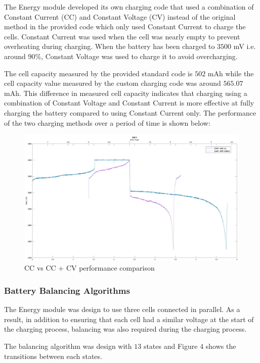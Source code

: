 \documentclass[11pt, a4paper]{article}
\begin{document}
The Energy module developed its own charging code that used a combination of Constant Current (CC) and Constant Voltage (CV) instead of the original method in the provided code which only used Constant Current to charge the cells. Constant Current was used when the cell was nearly empty to prevent overheating during charging\cite{Energy_constant_current}. When the battery has been charged to $3500$ mV i.e. around 90\%, Constant Voltage was used to charge it to avoid overcharging. 

The cell capacity measured by the provided standard code is $502$ mAh while the cell capacity value measured by the custom charging code was around $565.07$ mAh. This difference in measured cell capacity indicates that charging using a combination of Constant Voltage and Constant Current is more effective at fully charging the battery compared to using Constant Current only. The performance of the two charging methods over a period of time is shown below:
\begin{figure} [h!]
    \centering
    \includegraphics[scale=0.5]{CC and CV.JPG}
    \caption{CC vs CC + CV performance comparison}
\end{figure} 

\pagebreak

\subsubsection{Battery Balancing Algorithms}

The Energy module was design to use three cells connected in parallel. As a result, in addition to ensuring that each cell had a similar voltage at the start of the charging process, balancing was also required during the charging process. 

The balancing algorithm was design with $13$ states and Figure 4 shows the transitions between each states.    
\end{document}
